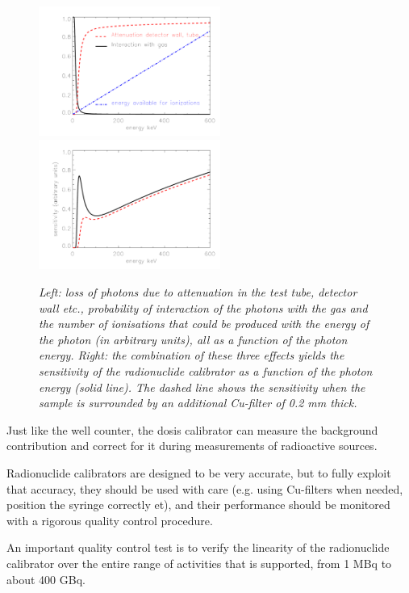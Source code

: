 \documentclass[11pt,oneside]{article}
\begin{document}
\begin{figure}[tb]
\hspace{-4mm}\includegraphics[width=0.53\textwidth]{figs/fig_dosecalib1.pdf}
        \includegraphics[width=0.53\textwidth]{figs/fig_dosecalib2.pdf}
\caption{\label{fig:dosecalib} \emph{Left: loss of photons due to
    attenuation in the test tube, detector wall etc., probability of
    interaction of the photons with the gas and the number of
    ionisations that could be produced with the energy of the photon
    (in arbitrary units), all as a function of the photon
    energy. Right: the combination of these three effects yields the
    sensitivity of the radionuclide calibrator as a function of the photon
    energy (solid line). The dashed line shows the sensitivity when
    the sample is surrounded by an additional Cu-filter of 0.2 mm thick.}}
\end{figure}

Just like the well counter, the dosis calibrator can measure the
background contribution and correct for it during measurements of
radioactive sources.

Radionuclide calibrators are designed to be very accurate, but to fully
exploit that accuracy, they should be used with care (e.g. using
Cu-filters when needed, position the syringe correctly et), and their
performance should be monitored with a rigorous quality control
procedure.

An important quality control test is to verify the linearity of the
radionuclide calibrator over the entire range of activities that is
supported, from 1 MBq to about 400 GBq.
\end{document}
